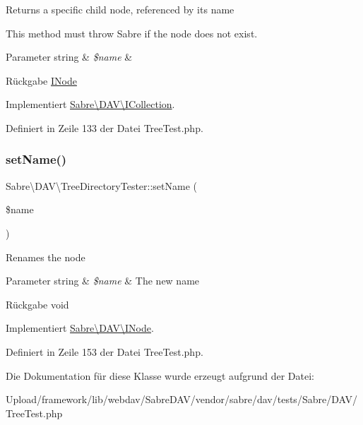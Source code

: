 Returns a specific child node, referenced by its name

This method must throw Sabre if the node does not exist.


\begin{DoxyParams}[1]{Parameter}
string & {\em \$name} & \\
\hline
\end{DoxyParams}
\begin{DoxyReturn}{Rückgabe}
\mbox{\hyperlink{interface_sabre_1_1_d_a_v_1_1_i_node}{I\+Node}} 
\end{DoxyReturn}


Implementiert \mbox{\hyperlink{interface_sabre_1_1_d_a_v_1_1_i_collection_a09f82b07550611752abb149f468b89c2}{Sabre\textbackslash{}\+D\+A\+V\textbackslash{}\+I\+Collection}}.



Definiert in Zeile 133 der Datei Tree\+Test.\+php.

\mbox{\label{class_sabre_1_1_d_a_v_1_1_tree_directory_tester_ab53a32b6d72da045de6896915167ba8a}} 
\subsubsection{\texorpdfstring{set\+Name()}{setName()}}
{\footnotesize\ttfamily Sabre\textbackslash{}\+D\+A\+V\textbackslash{}\+Tree\+Directory\+Tester\+::set\+Name (\begin{DoxyParamCaption}\item[{}]{\$name }\end{DoxyParamCaption})}

Renames the node


\begin{DoxyParams}[1]{Parameter}
string & {\em \$name} & The new name \\
\hline
\end{DoxyParams}
\begin{DoxyReturn}{Rückgabe}
void 
\end{DoxyReturn}


Implementiert \mbox{\hyperlink{interface_sabre_1_1_d_a_v_1_1_i_node_ac90fa5526e98def2e1f51bc57a772366}{Sabre\textbackslash{}\+D\+A\+V\textbackslash{}\+I\+Node}}.



Definiert in Zeile 153 der Datei Tree\+Test.\+php.



Die Dokumentation für diese Klasse wurde erzeugt aufgrund der Datei\+:\begin{DoxyCompactItemize}
\item 
Upload/framework/lib/webdav/\+Sabre\+D\+A\+V/vendor/sabre/dav/tests/\+Sabre/\+D\+A\+V/Tree\+Test.\+php\end{DoxyCompactItemize}
